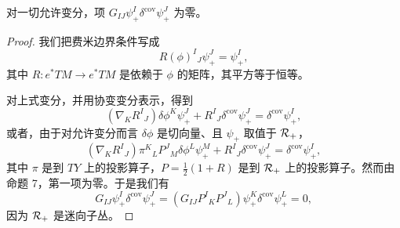 \begin{proposition}[8] 对一切允许变分，项 $G_{IJ}\psi_+^I\delta^{\mathrm{cov}}\psi_+^J$ 为零。\end{proposition}

\begin{proof}
我们把费米边界条件写成
\[
  R(\phi)^I{}_J\psi_+^J=\psi_+^I,
\]
其中 $R:e^*TM\to e^*TM$ 是依赖于 $\phi$ 的矩阵，其平方等于恒等。

对上式变分，并用协变变分表示，得到
\[
  (\nabla_KR^I{}_J)\delta\phi^K\psi_+^J+R^I{}_J\delta^{\mathrm{cov}}\psi_+^J=\delta^{\mathrm{cov}}\psi_+^I,
\]
或者，由于对允许变分而言 $\delta\phi$ 是切向量、且 $\psi_+$ 取值于 $\mathcal{R}_+$，
\[
  (\nabla_KR^I{}_J)\pi^K{}_LP^J{}_M\delta\phi^L\psi_+^M+R^I{}_J\delta^{\mathrm{cov}}\psi_+^J=\delta^{\mathrm{cov}}\psi_+^I,
\]
其中 $\pi$ 是到 $TY$ 上的投影算子，$P=\frac{1}{2}(1+R)$ 是到 $\mathcal{R}_+$ 上的投影算子。然而由命题 7，第一项为零。于是我们有
\[
  G_{IJ}\psi_+^I\delta^{\mathrm{cov}}\psi_+^J=(G_{IJ}P^I{}_KP^J{}_L)\psi_+^K\delta^{\mathrm{cov}}\psi_+^L=0,
\]
因为 $\mathcal{R}_+$ 是迷向子丛。\end{proof}


